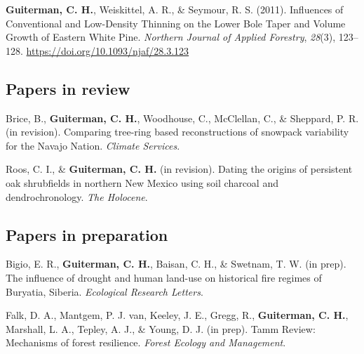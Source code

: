 \documentclass[11pt,a4paper,]{moderncv}
\begin{document}
\leavevmode\hypertarget{ref-Guiterman2011}{}%
\textbf{Guiterman, C. H.}, Weiskittel, A. R., \& Seymour, R. S. (2011).
Influences of Conventional and Low-Density Thinning on the Lower Bole
Taper and Volume Growth of Eastern White Pine. \emph{Northern Journal of
Applied Forestry}, \emph{28}(3), 123--128.
\url{https://doi.org/10.1093/njaf/28.3.123}

\endgroup

\vspace{12pt}

\hypertarget{papers-in-review}{%
\subsection{Papers in review}\label{papers-in-review}}

\begingroup
\setlength{\parindent}{-0.5in}
\setlength{\leftskip}{1.0in}
\setlength{\parskip}{8pt}

\hypertarget{refs_inreview}{}
\leavevmode\hypertarget{ref-Briceclimateservices}{}%
Brice, B., \textbf{Guiterman, C. H.}, Woodhouse, C., McClellan, C., \&
Sheppard, P. R. (in revision). Comparing tree-ring based reconstructions
of snowpack variability for the Navajo Nation. \emph{Climate Services}.

\leavevmode\hypertarget{ref-Roosholocene}{}%
Roos, C. I., \& \textbf{Guiterman, C. H.} (in revision). Dating the
origins of persistent oak shrubfields in northern New Mexico using soil
charcoal and dendrochronology. \emph{The Holocene}.

\endgroup

\vspace{12pt}

\hypertarget{papers-in-preparation}{%
\subsection{Papers in preparation}\label{papers-in-preparation}}

\begingroup
\setlength{\parindent}{-0.5in}
\setlength{\leftskip}{1.0in}
\setlength{\parskip}{8pt}

\hypertarget{refs_inprep}{}
\leavevmode\hypertarget{ref-BigioBuryatia}{}%
Bigio, E. R., \textbf{Guiterman, C. H.}, Baisan, C. H., \& Swetnam, T.
W. (in prep). The influence of drought and human land-use on historical
fire regimes of Buryatia, Siberia. \emph{Ecological Research Letters}.

\leavevmode\hypertarget{ref-FalkTAMM}{}%
Falk, D. A., Mantgem, P. J. van, Keeley, J. E., Gregg, R.,
\textbf{Guiterman, C. H.}, Marshall, L. A., Tepley, A. J., \& Young, D.
J. (in prep). Tamm Review: Mechanisms of forest resilience. \emph{Forest
Ecology and Management}.
\end{document}
